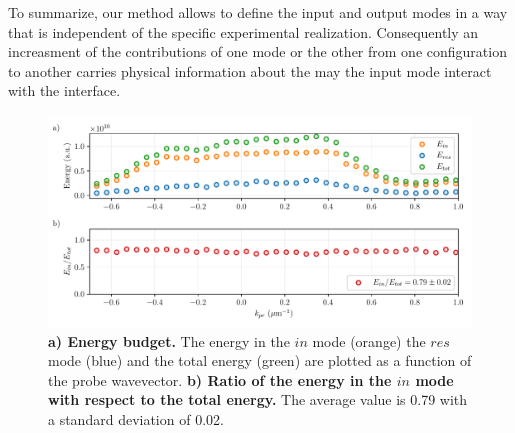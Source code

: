 To summarize, our method allows to define the input and output modes in a way that is independent of the specific experimental realization. Consequently an increasment of the contributions
of one mode or the other from one configuration to another carries physical information about the may the input mode interact with the interface.  
 \begin{figure}
    \centering
    \includegraphics[width=1\textwidth]{chap_stimulated_hawking/fig/energy_budget.pdf}
    \caption{\textbf{a) Energy budget.} The energy in the $in$ mode (orange) the $res$ mode (blue) and the total energy (green) are plotted as a function of the probe wavevector. 
    \textbf{b) Ratio of the energy in the $in$ mode with respect to the total energy.} The average value is 0.79 with a standard deviation of 0.02.}
    \label{fig:energy_budget}
 \end{figure}

